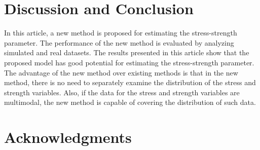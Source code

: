 \documentclass[twoside]{article}
\begin{document}
\section{Discussion and Conclusion}
In this article, a new method is proposed for estimating the stress-strength parameter. The performance of the new method is evaluated by analyzing simulated and real datasets. The results presented in this article show that the proposed model has good potential for estimating the stress-strength parameter. The advantage of the new method over existing methods is that in the new method, there is no need to separately examine the distribution of the stress and strength variables. Also, if the data for the stress and strength variables are multimodal, the new method is capable of covering the distribution of such data.

\section*{Acknowledgments}   

\end{document}
